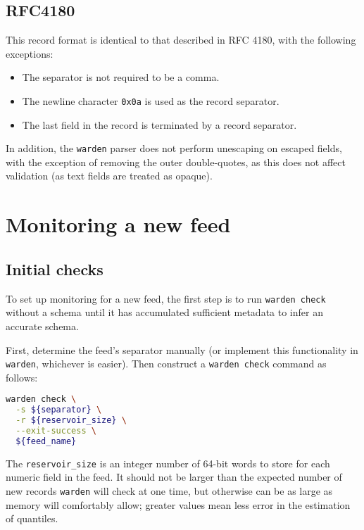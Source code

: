 \documentclass[a4paper]{article}
\begin{document}
\subsection{RFC4180}

This record format is identical to that described in RFC 4180, with
the following exceptions:

\begin{itemize}
  \item The separator is not required to be a comma.
  \item The newline character \texttt{0x0a} is used as the record
    separator.
  \item The last field in the record is terminated by a record separator.
\end{itemize}

In addition, the \texttt{warden} parser does not perform unescaping on
escaped fields, with the exception of removing the outer
double-quotes, as this does not affect validation (as text fields are
treated as opaque).

\section{Monitoring a new feed}\label{monitoring-a-new-feed}

\subsection{Initial checks}

To set up monitoring for a new feed, the first step is to run
\texttt{warden check} without a schema until it has accumulated
sufficient metadata to infer an accurate schema.

First, determine the feed's separator manually (or implement this
functionality in \texttt{warden}, whichever is easier). Then construct
a \texttt{warden check} command as follows:

\begin{lstlisting}[language=bash]
warden check \
  -s ${separator} \
  -r ${reservoir_size} \
  --exit-success \
  ${feed_name}
\end{lstlisting}

The \texttt{reservoir\_size} is an integer number of 64-bit words to
store for each numeric field in the feed. It should not be larger than
the expected number of new records \texttt{warden} will check at one
time, but otherwise can be as large as memory will comfortably allow;
greater values mean less error in the estimation of quantiles.
\end{document}
